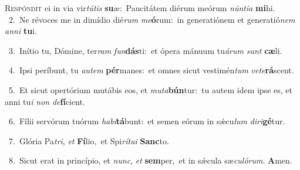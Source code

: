 \lettrine{\initial\textcolor{\initialcolor}{R}}{espóndit} ei in via vir\-\textit{tú}\-\textit{tis} \textbf{su}\-æ:~\star Paucitátem diérum meórum \textit{nún}\-\textit{ti}\textit{a} \textbf{mi}\-hi.\\
{\numbfont\textcolor{\numbcolor}{~2.}}~Ne révoces me in dimídio dié\textit{rum} \textit{me}\-\textbf{ó}rum:~\star in generatiónem et generatió\textit{nem} \textit{an}\-\textit{ni} \textbf{tu}\-i.\par
{\numbfont\textcolor{\numbcolor}{~3.}}~Inítio tu, Dómine, ter\textit{ram} \textit{fun}\-\textbf{dás}ti:~\star et ópera mánuum tu\-\textit{á}\-\textit{rum} \textit{sunt} \textbf{cæ}\-li.\par
{\numbfont\textcolor{\numbcolor}{~4.}}~Ipsi períbunt, tu \textit{au}\-\textit{tem} \textbf{pér}\-manes:~\star et omnes sicut vestimén\textit{tum} \textit{ve}\-\textit{te}\textbf{rá}scent.\par
{\numbfont\textcolor{\numbcolor}{~5.}}~Et sicut opertórium mutábis eos, et \textit{mu}\-\textit{ta}\textbf{bún}tur:~\star tu autem idem ipse es, et anni tu\textit{i} \textit{non} \textit{de}\-\textbf{fí}cient.\par
{\numbfont\textcolor{\numbcolor}{~6.}}~Fílii servórum tuórum \textit{ha}\-\textit{bi}\textbf{tá}bunt:~\star et semen eórum in sǽcu\textit{lum} \textit{di}\-\textit{ri}\textbf{gé}tur.\par
{\numbfont\textcolor{\numbcolor}{~7.}}~Glória Pa\-\textit{tri}\-, \textit{et} \textbf{Fí}\-lio,~\star et Spi\-\textit{rí}\-\textit{tu}\textit{i} \textbf{Sanc}\-to.\par
{\numbfont\textcolor{\numbcolor}{~8.}}~Sicut erat in princípio, et \textit{nunc}\-, \textit{et} \textbf{sem}\-per,~\star et in sǽcula sæ\-\textit{cu}\-\textit{ló}\textit{rum}. \textbf{A}\-men.\par

